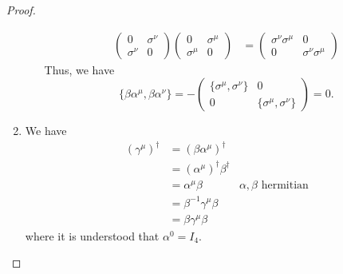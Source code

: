 \begin{proof}
\begin{enumerate}[label=(\alph*)]
\begin{enumerate}[label=(\arabic*)]
\begin{align*}
		\begin{pmatrix} 0 & \sigma^\nu \\ \sigma^\nu & 0 \end{pmatrix} \begin{pmatrix} 0 & \sigma^\mu \\ \sigma^\mu & 0 \end{pmatrix} &= \begin{pmatrix} \sigma^\nu\sigma^\mu & 0 \\ 0 & \sigma^\nu\sigma^\mu \end{pmatrix}
	\end{align*}
	Thus, we have
	\[
		\{\beta\alpha^\mu, \beta\alpha^\nu\} = -\begin{pmatrix} \{\sigma^\mu, \sigma^\nu\} & 0 \\ 0 & \{\sigma^\mu, \sigma^\nu\} \end{pmatrix} =0
	.\] 
		\end{enumerate}
	\item We have
		\begin{align*}
			(\gamma^\mu)^\dagger &= (\beta\alpha^\mu)^\dagger\\
					     &= (\alpha^\mu)^\dagger \beta^\dagger \\
					     &= \alpha^\mu \beta & \alpha,\beta\text{ hermitian}\\
					     &= \beta^{-1}\gamma^\mu \beta\\
					     &= \beta \gamma^{\mu}\beta
		\end{align*}
		where it is understood that $\alpha^0=I_4$.\qedhere
\end{enumerate}
\end{proof}
